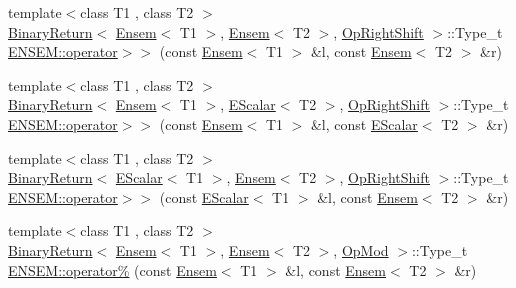 \begin{DoxyCompactItemize}
\item 
{\footnotesize template$<$class T1 , class T2 $>$ }\\\mbox{\hyperlink{structENSEM_1_1BinaryReturn}{Binary\+Return}}$<$ \mbox{\hyperlink{classENSEM_1_1Ensem}{Ensem}}$<$ T1 $>$, \mbox{\hyperlink{classENSEM_1_1Ensem}{Ensem}}$<$ T2 $>$, \mbox{\hyperlink{structENSEM_1_1OpRightShift}{Op\+Right\+Shift}} $>$\+::Type\+\_\+t \mbox{\hyperlink{group__eensem_ga8b0f105a14d5692cffad3db6bae659fb}{E\+N\+S\+E\+M\+::operator$>$$>$}} (const \mbox{\hyperlink{classENSEM_1_1Ensem}{Ensem}}$<$ T1 $>$ \&l, const \mbox{\hyperlink{classENSEM_1_1Ensem}{Ensem}}$<$ T2 $>$ \&r)
\item 
{\footnotesize template$<$class T1 , class T2 $>$ }\\\mbox{\hyperlink{structENSEM_1_1BinaryReturn}{Binary\+Return}}$<$ \mbox{\hyperlink{classENSEM_1_1Ensem}{Ensem}}$<$ T1 $>$, \mbox{\hyperlink{classENSEM_1_1EScalar}{E\+Scalar}}$<$ T2 $>$, \mbox{\hyperlink{structENSEM_1_1OpRightShift}{Op\+Right\+Shift}} $>$\+::Type\+\_\+t \mbox{\hyperlink{group__eensem_ga1741fb098dc44e2f5fcd2bcabeafa0ed}{E\+N\+S\+E\+M\+::operator$>$$>$}} (const \mbox{\hyperlink{classENSEM_1_1Ensem}{Ensem}}$<$ T1 $>$ \&l, const \mbox{\hyperlink{classENSEM_1_1EScalar}{E\+Scalar}}$<$ T2 $>$ \&r)
\item 
{\footnotesize template$<$class T1 , class T2 $>$ }\\\mbox{\hyperlink{structENSEM_1_1BinaryReturn}{Binary\+Return}}$<$ \mbox{\hyperlink{classENSEM_1_1EScalar}{E\+Scalar}}$<$ T1 $>$, \mbox{\hyperlink{classENSEM_1_1Ensem}{Ensem}}$<$ T2 $>$, \mbox{\hyperlink{structENSEM_1_1OpRightShift}{Op\+Right\+Shift}} $>$\+::Type\+\_\+t \mbox{\hyperlink{group__eensem_ga8dbc329d9b31f5c8d7f4c54f10ea370b}{E\+N\+S\+E\+M\+::operator$>$$>$}} (const \mbox{\hyperlink{classENSEM_1_1EScalar}{E\+Scalar}}$<$ T1 $>$ \&l, const \mbox{\hyperlink{classENSEM_1_1Ensem}{Ensem}}$<$ T2 $>$ \&r)
\item 
{\footnotesize template$<$class T1 , class T2 $>$ }\\\mbox{\hyperlink{structENSEM_1_1BinaryReturn}{Binary\+Return}}$<$ \mbox{\hyperlink{classENSEM_1_1Ensem}{Ensem}}$<$ T1 $>$, \mbox{\hyperlink{classENSEM_1_1Ensem}{Ensem}}$<$ T2 $>$, \mbox{\hyperlink{structENSEM_1_1OpMod}{Op\+Mod}} $>$\+::Type\+\_\+t \mbox{\hyperlink{group__eensem_gaf077fbdf11a765fcbfe7fbb3b9e94a02}{E\+N\+S\+E\+M\+::operator\%}} (const \mbox{\hyperlink{classENSEM_1_1Ensem}{Ensem}}$<$ T1 $>$ \&l, const \mbox{\hyperlink{classENSEM_1_1Ensem}{Ensem}}$<$ T2 $>$ \&r)
\item 

\end{DoxyCompactItemize}
